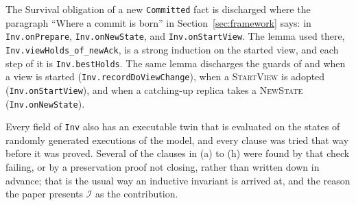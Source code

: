 \documentclass[11pt,a4paper]{article}
\theoremstyle{plain}
\theoremstyle{definition}
\theoremstyle{remark}
\newcommand{\msg}[1]{\textsc{#1}}
\newcommand{\Inv}{\mathcal{I}}
\begin{document}
The Survival obligation of a new \texttt{Committed} fact is discharged
where the paragraph ``Where a commit is born'' in
Section~\ref{sec:framework} says: in \texttt{Inv.onPrepare},
\texttt{Inv.onNewState}, and \texttt{Inv.onStartView}. The lemma used
there, \texttt{Inv.viewHolds\_of\_newAck}, is a strong induction on the
started view, and each step of it is \texttt{Inv.bestHolds}. The same lemma discharges the
guards of  and  when a view is
started (\texttt{Inv.recordDoViewChange}), when a \msg{StartView} is
adopted (\texttt{Inv.onStartView}), and when a catching-up replica takes
a \msg{NewState} (\texttt{Inv.onNewState}).

Every field of \texttt{Inv} also has an executable twin that is evaluated
on the states of randomly generated executions of the model, and every
clause was tried that way before it was proved. Several of the clauses in
(a) to (h) were found by that check failing, or by a preservation proof
not closing, rather than written down in advance; that is the usual way
an inductive invariant is arrived at, and the reason the paper presents
$\Inv$ as the contribution.
\end{document}
